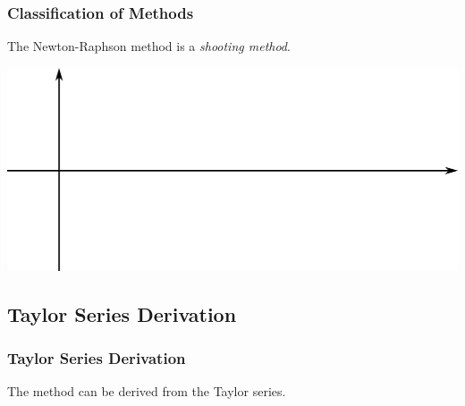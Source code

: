 \documentclass[fleqn]{beamer} %
\newcommand{\sectionIIsubsectionItitle}{Classification of Methods}
\newcommand{\sectionIIsubsectionIItitle}{Taylor Series Derivation}
\begin{document}
			\begin{frame}[label=sectionIIsubsectionI]
				\frametitle{\sectionIIsubsectionItitle}
				\bigskip

				The Newton-Raphson method is a {\it shooting method}. \vspace{5mm}

				\includegraphics[scale=.40]{images/topic3_fig1.png}
				
				\btVFill
			\end{frame}

		\subsection{\sectionIIsubsectionIItitle}\label{sectionIIsubsectionII}

			\begin{frame}
				\frametitle{\sectionIIsubsectionIItitle}
				\bigskip

				The method can be derived from the Taylor series. \vspace{5mm} \\
	
				 \vspace{50mm}
		
				\btVFill 
			\end{frame}	
\end{document}
